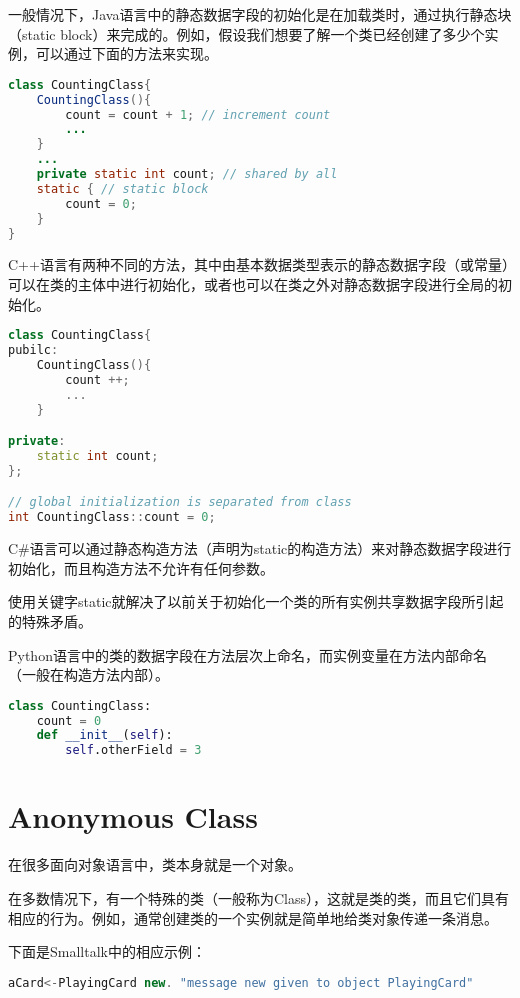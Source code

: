 一般情况下，Java语言中的静态数据字段的初始化是在加载类时，通过执行静态块（static block）来完成的。例如，假设我们想要了解一个类已经创建了多少个实例，可以通过下面的方法来实现。

\begin{lstlisting}[language=Java]
class CountingClass{
	CountingClass(){
		count = count + 1; // increment count
		...
	}
	...
	private static int count; // shared by all
	static { // static block
		count = 0;
	}
}
\end{lstlisting}

C++语言有两种不同的方法，其中由基本数据类型表示的静态数据字段（或常量）可以在类的主体中进行初始化，或者也可以在类之外对静态数据字段进行全局的初始化。



\begin{lstlisting}[language=C++]
class CountingClass{
pubilc:
	CountingClass(){
		count ++;
		...
	}

private:
	static int count;
};

// global initialization is separated from class
int CountingClass::count = 0;
\end{lstlisting}

C\#语言可以通过静态构造方法（声明为static的构造方法）来对静态数据字段进行初始化，而且构造方法不允许有任何参数。


使用关键字static就解决了以前关于初始化一个类的所有实例共享数据字段所引起的特殊矛盾。

Python语言中的类的数据字段在方法层次上命名，而实例变量在方法内部命名（一般在构造方法内部）。

\begin{lstlisting}[language=Python]
class CountingClass:
	count = 0
	def __init__(self):
		self.otherField = 3
\end{lstlisting}



\section{Anonymous Class}

在很多面向对象语言中，类本身就是一个对象。

在多数情况下，有一个特殊的类（一般称为Class），这就是类的类，而且它们具有相应的行为。例如，通常创建类的一个实例就是简单地给类对象传递一条消息。

下面是Smalltalk中的相应示例：

\begin{lstlisting}[language=C++]
aCard<-PlayingCard new. "message new given to object PlayingCard"
\end{lstlisting}

